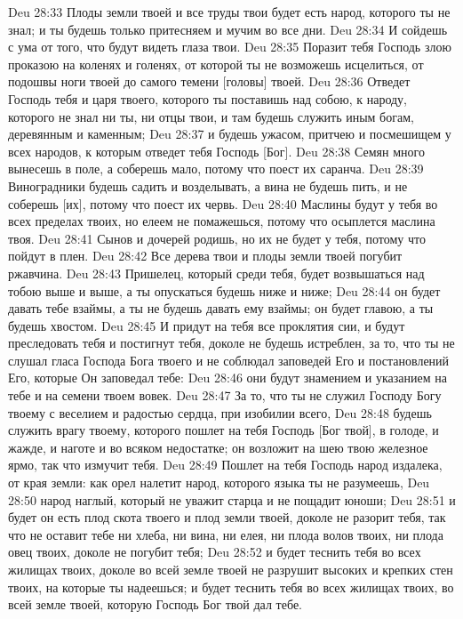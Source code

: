 \vs Deu 28:33 Плоды земли твоей и все труды твои будет есть народ, которого ты не знал; и ты будешь только притесняем и мучим во все дни.
\vs Deu 28:34 И сойдешь с ума от того, что будут видеть глаза твои.
\vs Deu 28:35 Поразит тебя Господь злою проказою на коленях и голенях, от которой ты не возможешь исцелиться, от подошвы ноги твоей до самого темени [головы] твоей.
\vs Deu 28:36 Отведет Господь тебя и царя твоего, которого ты поставишь над собою, к народу, которого не знал ни ты, ни отцы твои, и там будешь служить иным богам, деревянным и каменным;
\vs Deu 28:37 и будешь ужасом, притчею и посмешищем у всех народов, к которым отведет тебя Господь [Бог].
\vs Deu 28:38 Семян много вынесешь в поле, а соберешь мало, потому что поест их саранча.
\vs Deu 28:39 Виноградники будешь садить и возделывать, а вина не будешь пить, и не соберешь  [их], потому что поест их червь.
\vs Deu 28:40 Маслины будут у тебя во всех пределах твоих, но елеем не помажешься, потому что осыплется маслина твоя.
\vs Deu 28:41 Сынов и дочерей родишь, но их не будет у тебя, потому что пойдут в плен.
\vs Deu 28:42 Все дерева твои и плоды земли твоей погубит ржавчина.
\vs Deu 28:43 Пришелец, который среди тебя, будет возвышаться над тобою выше и выше, а ты опускаться будешь ниже и ниже;
\vs Deu 28:44 он будет давать тебе взаймы, а ты не будешь давать ему взаймы; он будет главою, а ты будешь хвостом.
\vs Deu 28:45 И придут на тебя все проклятия сии, и будут преследовать тебя и постигнут тебя, доколе не будешь истреблен, за то, что ты не слушал гласа Господа Бога твоего и не соблюдал заповедей Его и постановлений Его, которые Он заповедал тебе:
\vs Deu 28:46 они будут знамением и указанием на тебе и на семени твоем вовек.
\vs Deu 28:47 За то, что ты не служил Господу Богу твоему с веселием и радостью сердца, при изобилии всего,
\vs Deu 28:48 будешь служить врагу твоему, которого пошлет на тебя Господь [Бог твой], в голоде, и жажде, и наготе и во всяком недостатке; он возложит на шею твою железное ярмо, так что измучит тебя.
\vs Deu 28:49 Пошлет на тебя Господь народ издалека, от края земли: как орел налетит народ, которого языка ты не разумеешь,
\vs Deu 28:50 народ наглый, который не уважит старца и не пощадит юноши;
\vs Deu 28:51 и будет он есть плод скота твоего и плод земли твоей, доколе не разорит тебя, так что не оставит тебе ни хлеба, ни вина, ни елея, ни плода волов твоих, ни плода овец твоих, доколе не погубит тебя;
\vs Deu 28:52 и будет теснить тебя во всех жилищах твоих, доколе во всей земле твоей не разрушит высоких и крепких стен твоих, на которые ты надеешься; и будет теснить тебя во всех жилищах твоих, во всей земле твоей, которую Господь Бог твой дал тебе.
